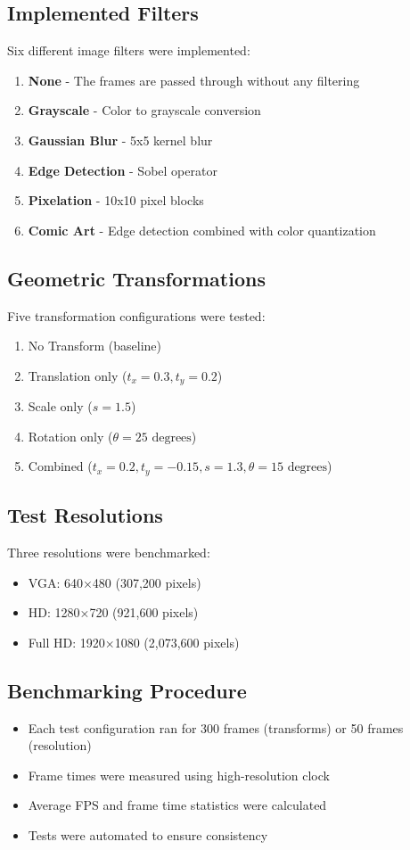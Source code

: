 \documentclass[12pt,a4paper]{article}
\begin{document}
\subsection{Implemented Filters}
Six different image filters were implemented:
\begin{enumerate}
    \item \textbf{None} - The frames are passed through without any filtering
    \item \textbf{Grayscale} - Color to grayscale conversion
    \item \textbf{Gaussian Blur} - 5x5 kernel blur
    \item \textbf{Edge Detection} - Sobel operator
    \item \textbf{Pixelation} - 10x10 pixel blocks
    \item \textbf{Comic Art} - Edge detection combined with color quantization
\end{enumerate}

\subsection{Geometric Transformations}
Five transformation configurations were tested:
\begin{enumerate}
    \item No Transform (baseline)
    \item Translation only ($t_x = 0.3, t_y = 0.2$)
    \item Scale only ($s = 1.5$)
    \item Rotation only ($\theta = 25 \text{ degrees}$)
    \item Combined ($t_x = 0.2, t_y = -0.15, s = 1.3, \theta = 15 \text{ degrees}$)
\end{enumerate}

\subsection{Test Resolutions}
Three resolutions were benchmarked:
\begin{itemize}
    \item VGA: 640×480 (307,200 pixels)
    \item HD: 1280×720 (921,600 pixels)
    \item Full HD: 1920×1080 (2,073,600 pixels)
\end{itemize}

\subsection{Benchmarking Procedure}
\begin{itemize}
    \item Each test configuration ran for 300 frames (transforms) or 50 frames (resolution)
    \item Frame times were measured using high-resolution clock
    \item Average FPS and frame time statistics were calculated
    \item Tests were automated to ensure consistency
\end{itemize}
\end{document}
